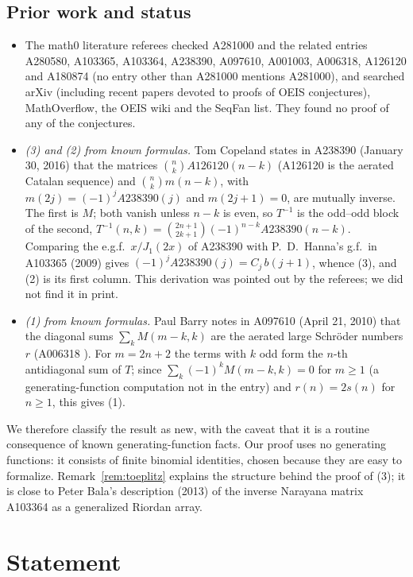 \documentclass[11pt]{amsart}
\theoremstyle{plain}
\theoremstyle{definition}
\begin{document}
\subsection*{Prior work and status}
\begin{itemize}
\item The math0 literature referees checked A281000 and the related entries A280580, A103365, A103364, A238390, A097610, A001003, A006318, A126120 and A180874 (no entry other than A281000 mentions A281000), and searched arXiv (including recent papers devoted to proofs of OEIS conjectures), MathOverflow, the OEIS wiki and the SeqFan list. They found no proof of any of the conjectures.
\item \emph{(3) and (2) from known formulas.} Tom Copeland states in A238390 \cite{A238390} (January 30, 2016) that the matrices $\binom nk A126120(n-k)$ (A126120 \cite{A126120} is the aerated Catalan sequence) and $\binom nk m(n-k)$, with $m(2j)=(-1)^jA238390(j)$ and $m(2j+1)=0$, are mutually inverse. The first is $M$; both vanish unless $n-k$ is even, so $T^{-1}$ is the odd--odd block of the second, $T^{-1}(n,k)=\binom{2n+1}{2k+1}(-1)^{n-k}A238390(n-k)$. Comparing the e.g.f.\ $x/J_1(2x)$ of A238390 with P.~D.~Hanna's g.f.\ in A103365 \cite{A103365} (2009) gives $(-1)^jA238390(j)=C_j\,b(j+1)$, whence (3), and (2) is its first column. This derivation was pointed out by the referees; we did not find it in print.
\item \emph{(1) from known formulas.} Paul Barry notes in A097610 (April 21, 2010) that the diagonal sums $\sum_kM(m-k,k)$ are the aerated large Schr\"oder numbers $r$ (A006318 \cite{A006318}). For $m=2n+2$ the terms with $k$ odd form the $n$-th antidiagonal sum of $T$; since $\sum_k(-1)^kM(m-k,k)=0$ for $m\ge1$ (a generating-function computation not in the entry) and $r(n)=2s(n)$ for $n\ge1$, this gives (1).
\end{itemize}
We therefore classify the result as new, with the caveat that it is a routine consequence of known generating-function facts. Our proof uses no generating functions: it consists of finite binomial identities, chosen because they are easy to formalize. Remark~\ref{rem:toeplitz} explains the structure behind the proof of (3); it is close to Peter Bala's description (2013) of the inverse Narayana matrix A103364 \cite{A103364} as a generalized Riordan array.

\section{Statement}\label{sec:statement}
\end{document}
